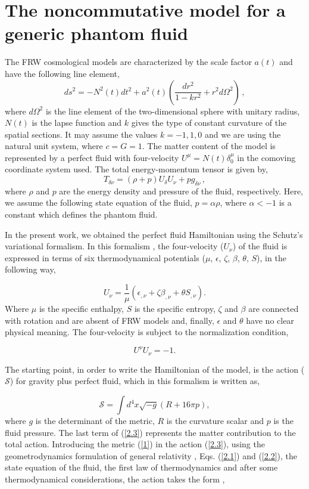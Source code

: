 \documentclass[12pt]{article}
\newcommand{\be}{\begin{equation}}
\newcommand{\ee}{\end{equation}}
\newcommand{\0}{{(0)}}
\newcommand{\1}{{(1)}}
\newcommand{\2}{{(2)}}
\newcommand{\ep}{{\epsilon}}
\begin{document}
\section{The noncommutative model for a generic phantom fluid}
\label{sec:general}

The FRW cosmological models are characterized by the
scale factor $a(t)$ and have the following line element,
\begin{equation}  
\label{1}
ds^2 = - N^2(t) dt^2 + a^2(t)\left( \frac{dr^2}{1 - kr^2} + r^2 d\Omega^2
\right)\, ,
\end{equation}
where $d\Omega^2$ is the line element of the two-dimensional sphere with
unitary radius, $N(t)$ is the lapse function and $k$ gives the type of
constant curvature of the spatial sections. It may assume the values $k=-1, 1, 0$ 
and we are using the natural
unit system, where $c=G=1$. The matter content of the model is
represented by a perfect fluid with four-velocity $U^\mu = N(t)\delta^{\mu}_0$
in the comoving coordinate system used. The total energy-momentum tensor 
is given by,
\begin{equation}
T_{\delta \nu} = (\rho+p)U_{\delta}U_{\nu} + p g_{\delta \nu}\, ,  
\label{2}
\end{equation}
where $\rho$ and $p$ are the energy density and pressure of the fluid,
respectively. Here, we assume the following state equation of the fluid, $p = \alpha\rho$, where $\alpha < -1$ is a constant
which defines the phantom fluid.

In the present work, we obtained the perfect fluid Hamiltonian using
the Schutz's variational formalism. In this formalism \cite{schutz}, the four-velocity ($U_\nu$) of the fluid is expressed in terms of 
six thermodynamical potentials ($\mu$, $\ep$, $\zeta$, $\beta$, $\theta$, $S$), in the following way,

\be
\label{2.1}
U_\nu = \frac{1}{\mu}\left(\ep_{,\nu}+\zeta\beta_{,\nu}+\theta S_{,\nu}\right).
\ee
Where $\mu$ is the specific enthalpy, $S$ is the specific entropy,
$\zeta$ and $\beta$ are connected with rotation and are absent of FRW models and, 
finally, $\ep$ and $\theta$ have no clear physical meaning. The four-velocity is subject to the normalization condition,

\be
\label{2.2}
U^\nu U_\nu = -1.
\ee

The starting point, in order to write the Hamiltonian of the model, is the action ($\mathcal{S}$) for gravity plus perfect fluid, which in this formalism is written as,

\be
\label{2.3}
\mathcal{S} = \int d^4x\sqrt{-g}(R + 16\pi p),
\ee
where $g$ is the determinant of the metric, $R$ is the curvature scalar and $p$ is the fluid pressure. The last term of (\ref{2.3}) 
represents the matter contribution to the total action. Introducing the metric (\ref{1}) in the action (\ref{2.3}), using the 
geometrodynamics formulation of general relativity \cite{wheeler}, Eqs. (\ref{2.1}) and (\ref{2.2}), the state equation of the fluid, the first law 
of thermodynamics and after some thermodynamical considerations, the action takes the form \cite{germano1},
\end{document}
